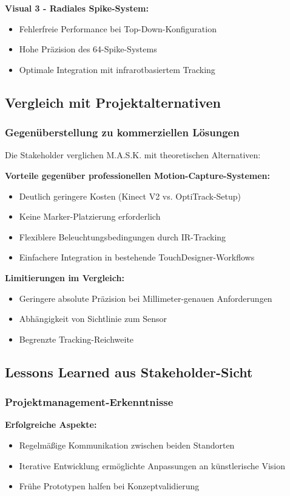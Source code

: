 \textbf{Visual 3 - Radiales Spike-System:}
\begin{itemize}
    \item Fehlerfreie Performance bei Top-Down-Konfiguration
    \item Hohe Präzision des 64-Spike-Systems
    \item Optimale Integration mit infrarotbasiertem Tracking
\end{itemize}

\subsection{Vergleich mit Projektalternativen}

\subsubsection{Gegenüberstellung zu kommerziellen Lösungen}
Die Stakeholder verglichen M.A.S.K. mit theoretischen Alternativen:

\textbf{Vorteile gegenüber professionellen Motion-Capture-Systemen:}
\begin{itemize}
    \item Deutlich geringere Kosten (Kinect V2 vs. OptiTrack-Setup)
    \item Keine Marker-Platzierung erforderlich
    \item Flexiblere Beleuchtungsbedingungen durch IR-Tracking
    \item Einfachere Integration in bestehende TouchDesigner-Workflows
\end{itemize}

\textbf{Limitierungen im Vergleich:}
\begin{itemize}
    \item Geringere absolute Präzision bei Millimeter-genauen Anforderungen
    \item Abhängigkeit von Sichtlinie zum Sensor
    \item Begrenzte Tracking-Reichweite
\end{itemize}

\subsection{Lessons Learned aus Stakeholder-Sicht}

\subsubsection{Projektmanagement-Erkenntnisse}
\textbf{Erfolgreiche Aspekte:}
\begin{itemize}
    \item Regelmäßige Kommunikation zwischen beiden Standorten
    \item Iterative Entwicklung ermöglichte Anpassungen an künstlerische Vision
    \item Frühe Prototypen halfen bei Konzeptvalidierung
\end{itemize}

